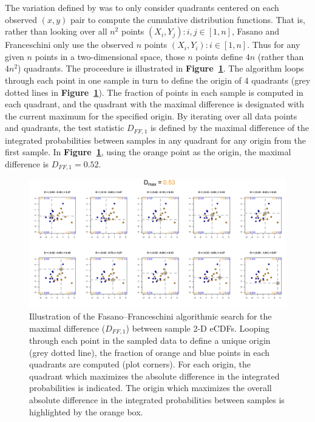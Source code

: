 \documentclass[codesnippet]{jss}
\begin{document}
The variation defined by \cite{Fasano1987}  was to only consider
quadrants centered on each observed $(x, y)$ pair to compute the
cumulative distribution functions. That is, rather than looking over all $n^2$ points
${(X_i, Y_j): i,j \in [1,n]}$, Fasano and Franceschini only use the observed $n$ points
${(X_i, Y_i): i \in [1,n]}$.
Thus for any given $n$ points in a two-dimensional space, those $n$ points define $4n$ (rather than
$4n^2$) quadrants.  The proceedure is illustrated in \textbf{Figure~\ref{fig:kstest2D}}.
The algorithm loops through each point in one sample in turn to define
the origin of 4 quadrants (grey dotted lines in
\textbf{Figure~\ref{fig:kstest2D}}). The fraction of points in each
sample is computed in each quadrant, and the quadrant with the maximal
difference is designated with the current maximum for the specified
origin. By iterating over all data points and quadrants, the test
statistic $D_{FF,1}$ is defined by the maximal difference of the
integrated probabilities between samples in any quadrant for any
origin from the first sample.  In \textbf{Figure~\ref{fig:kstest2D}},
using the orange point as the origin, the maximal difference is
$D_{FF,1} = 0.52$.

\begin{figure}[t!]
\centering
\includegraphics{fftestOutput}
\caption{\label{fig:kstest2D} Illustration of the Fasano--Franceschini algorithmic search for the maximal difference ($D_{FF,1}$) between sample 2-D eCDFs. Looping through each point in the sampled data to define a unique origin (grey dotted line), the fraction of orange and blue points in each quadrants are computed (plot corners). For each origin, the quadrant which maximizes the absolute difference in the integrated probabilities is indicated. The origin which maximizes the overall absolute difference in the integrated probabilities between samples is highlighted by the orange box.
}
\end{figure}
\end{document}
